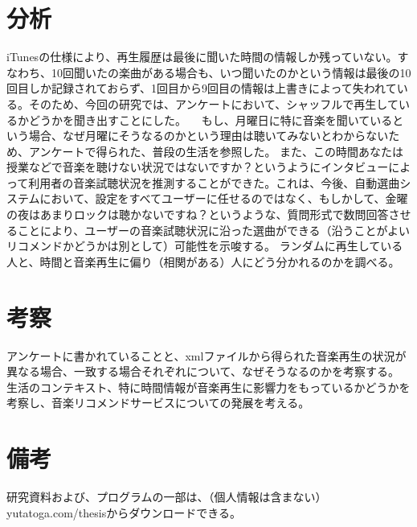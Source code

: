 \documentclass{jsarticle}
\begin{document}
\section{分析}
iTunesの仕様により、再生履歴は最後に聞いた時間の情報しか残っていない。すなわち、10回聞いたの楽曲がある場合も、いつ聞いたのかという情報は最後の10回目しか記録されておらず、1回目から9回目の情報は上書きによって失われている。そのため、今回の研究では、アンケートにおいて、シャッフルで再生しているかどうかを聞き出すことにした。
　もし、月曜日に特に音楽を聞いているという場合、なぜ月曜にそうなるのかという理由は聴いてみないとわからないため、アンケートで得られた、普段の生活を参照した。
また、この時間あなたは授業などで音楽を聴けない状況ではないですか？というようにインタビューによって利用者の音楽試聴状況を推測することができた。これは、今後、自動選曲システムにおいて、設定をすべてユーザーに任せるのではなく、もしかして、金曜の夜はあまりロックは聴かないですね？というような、質問形式で数問回答させることにより、ユーザーの音楽試聴状況に沿った選曲ができる（沿うことがよいリコメンドかどうかは別として）可能性を示唆する。
ランダムに再生している人と、時間と音楽再生に偏り（相関がある）人にどう分かれるのかを調べる。

\section{考察}
アンケートに書かれていることと、xmlファイルから得られた音楽再生の状況が異なる場合、一致する場合それぞれについて、なぜそうなるのかを考察する。
生活のコンテキスト、特に時間情報が音楽再生に影響力をもっているかどうかを考察し、音楽リコメンドサービスについての発展を考える。

\section{備考}
研究資料および、プログラムの一部は、（個人情報は含まない）
yutatoga.com/thesisからダウンロードできる。
\end{document}
